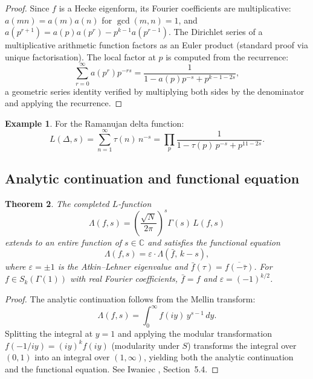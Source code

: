 \documentclass[12pt,a4paper]{amsart}
\newtheorem{theorem}{Theorem}[section]
\theoremstyle{definition}
\newtheorem{example}[theorem]{Example}
\begin{document}
\begin{proof}
  Since $f$ is a Hecke eigenform, its Fourier coefficients are multiplicative:
  $a(mn) = a(m)a(n)$ for $\gcd(m,n)=1$, and $a(p^{r+1}) = a(p)a(p^r) - p^{k-1}a(p^{r-1})$.
  The Dirichlet series of a multiplicative arithmetic function factors as an
  Euler product (standard proof via unique factorisation). The local factor
  at $p$ is computed from the recurrence:
  \[
    \sum_{r=0}^{\infty} a(p^r) p^{-rs}
    = \frac{1}{1 - a(p)p^{-s} + p^{k-1-2s}},
  \]
  a geometric series identity verified by multiplying both sides by the
  denominator and applying the recurrence.
\end{proof}

\begin{example}
  For the Ramanujan delta function:
  \[
    L(\Delta,s) = \sum_{n=1}^{\infty}\tau(n)\,n^{-s}
    = \prod_p \frac{1}{1 - \tau(p)\,p^{-s} + p^{11-2s}}.
  \]
\end{example}

\subsection{Analytic continuation and functional equation}

\begin{theorem}
  The completed $L$-function
  \[
    \Lambda(f,s) = \left(\frac{\sqrt{N}}{2\pi}\right)^s \Gamma(s)\,L(f,s)
  \]
  extends to an entire function of $s \in \mathbb{C}$ and satisfies the
  functional equation
  \[
    \Lambda(f,s) = \varepsilon \cdot \Lambda(\bar{f},\,k-s),
  \]
  where $\varepsilon = \pm 1$ is the Atkin--Lehner eigenvalue and
  $\bar{f}(\tau) = \overline{f(-\bar{\tau})}$.
  For $f \in S_k(\Gamma(1))$ with real Fourier coefficients, $\bar{f} = f$
  and $\varepsilon = (-1)^{k/2}$.
\end{theorem}

\begin{proof}
  The analytic continuation follows from the Mellin transform:
  \[
    \Lambda(f,s) = \int_0^{\infty} f(iy)\,y^{s-1}\,dy.
  \]
  Splitting the integral at $y=1$ and applying the modular transformation
  $f(-1/iy) = (iy)^k f(iy)$ (modularity under $S$) transforms the integral
  over $(0,1)$ into an integral over $(1,\infty)$, yielding both the
  analytic continuation and the functional equation. See Iwaniec \cite{Iwaniec},
  Section~5.4.
\end{proof}

\end{document}
